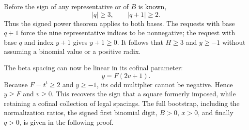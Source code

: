 Before the sign of any representative or of $B$ is known,
\[
 |q|\ge3,\qquad |q+1|\ge2.
\]
Thus the signed power theorem applies to both bases. The requests with
base $q+1$ force the nine representative indices to be nonnegative;
the request with base $q$ and index $y+1$ gives $y+1\ge0$.
It follows that $H\ge3$ and $y\ge-1$ without assuming a binomial value
or a positive radix.

The beta spacing can now be linear in its cofinal parameter:
\begin{equation}\label{eq:beta}
 y=F(2v+1).
\end{equation}
Because $F=t^t\ge2$ and $y\ge-1$, its odd multiplier cannot be negative.
Hence $y\ge F$ and $v\ge0$. This recovers the sign that a square formerly
imposed, while retaining a cofinal collection of legal spacings. The full
bootstrap, including the normalization ratios, the signed first binomial
digit, $B>0$, $x>0$, and finally $q>0$, is given in the following proof.



